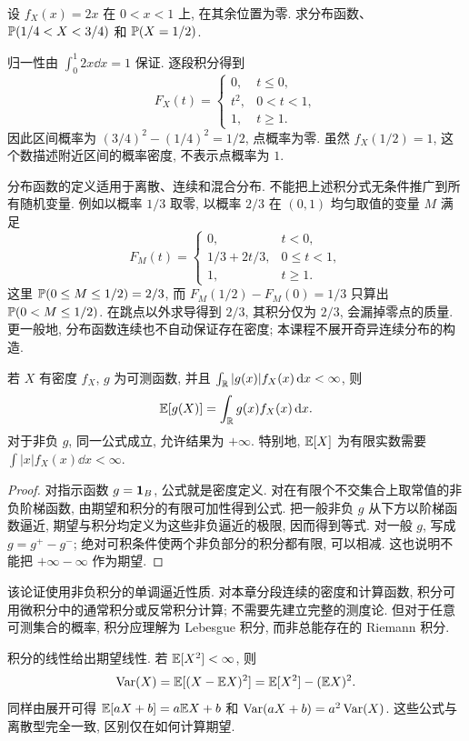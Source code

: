 \begin{example}
设 $f_X(x)=2x$ 在 $0<x<1$ 上, 在其余位置为零. 求分布函数、$\mathbb P(1/4<X<3/4)$ 和 $\mathbb P(X=1/2)$.
\end{example}
\begin{solution}
归一性由 $\int_0^1 2x\dd x=1$ 保证. 逐段积分得到
\[
 F_X(t)=\begin{cases}0,&t\le0,\\t^2,&0<t<1,\\1,&t\ge1.\end{cases}
\]
因此区间概率为 $(3/4)^2-(1/4)^2=1/2$, 点概率为零. 虽然 $f_X(1/2)=1$, 这个数描述附近区间的概率密度, 不表示点概率为 $1$.
\end{solution}

分布函数的定义适用于离散、连续和混合分布. 不能把上述积分式无条件推广到所有随机变量. 例如以概率 $1/3$ 取零, 以概率 $2/3$ 在 $(0,1)$ 均匀取值的变量 $M$ 满足
\[
 F_M(t)=\begin{cases}0,&t<0,\\1/3+2t/3,&0\le t<1,\\1,&t\ge1.\end{cases}
\]
这里 $\mathbb P(0\le M\le1/2)=2/3$, 而 $F_M(1/2)-F_M(0)=1/3$ 只算出 $\mathbb P(0<M\le1/2)$. 在跳点以外求导得到 $2/3$, 其积分仅为 $2/3$, 会漏掉零点的质量. 更一般地, 分布函数连续也不自动保证存在密度; 本课程不展开奇异连续分布的构造.

\begin{proposition}[连续型期望公式]
若 $X$ 有密度 $f_X$, $g$ 为可测函数, 并且 $\int_{\mathbb R}|g(x)|f_X(x)\,\mathrm d x<\infty$, 则
\[
 \mathbb E[g(X)]=\int_{\mathbb R}g(x)f_X(x)\,\mathrm d x.
\]
对于非负 $g$, 同一公式成立, 允许结果为 $+\infty$. 特别地, $\mathbb E[X]$ 为有限实数需要 $\int |x|f_X(x)\dd x<\infty$.
\end{proposition}
\begin{proof}
对指示函数 $g=\mathbf 1_B$, 公式就是密度定义. 对在有限个不交集合上取常值的非负阶梯函数, 由期望和积分的有限可加性得到公式. 把一般非负 $g$ 从下方以阶梯函数逼近, 期望与积分均定义为这些非负逼近的极限, 因而得到等式. 对一般 $g$, 写成 $g=g^+-g^-$; 绝对可积条件使两个非负部分的积分都有限, 可以相减. 这也说明不能把 $+\infty-\infty$ 作为期望.
\end{proof}

该论证使用非负积分的单调逼近性质. 对本章分段连续的密度和计算函数, 积分可用微积分中的通常积分或反常积分计算; 不需要先建立完整的测度论. 但对于任意可测集合的概率, 积分应理解为 Lebesgue 积分, 而非总能存在的 Riemann 积分.

积分的线性给出期望线性. 若 $\mathbb E[X^2]<\infty$, 则
\[
 \operatorname{Var}(X)=\mathbb E[(X-\mathbb E X)^2]=\mathbb E[X^2]-(\mathbb E X)^2.
\]
同样由展开可得 $\mathbb E[aX+b]=a\mathbb E X+b$ 和 $\operatorname{Var}(aX+b)=a^2\operatorname{Var}(X)$. 这些公式与离散型完全一致, 区别仅在如何计算期望.

